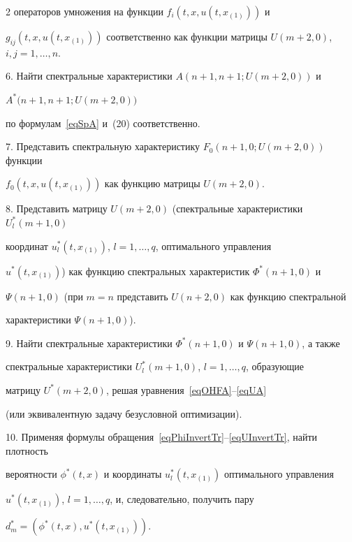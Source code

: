 \begin{multicols}{2}
операторов умножения на функции $f_i(t,x,u(t,x_{(1)}))$ и 


$g_{ij}(t,x,u(t,x_{(1)}))$ соответственно как функции матрицы ${U(m+2,0)}$, ${i,j = 1,\dots,n}$.





6. Найти спектральные характеристики ${A(n+1,n+1; U(m+2,0))}$ и


$A^*(n+1,n+1;$\linebreak $ U(m+2,0))$


по формулам~\eqref{eqSpA} и~(20) соответственно.





7. Представить спектральную характеристику ${F_0(n+1,0; U(m+2,0))}$ функции 


${f_0(t,x,u(t,x_{(1)}))}$ как функцию матрицы ${U(m+2,0)}$.





8.  Представить матрицу ${U(m+2,0)}$ (спект\-раль\-ные характеристики ${U^*_l(m+1,0)}$ 


координат $u^*_l(t,x_{(1)})$, ${l = 1,\dots,q}$, оптимального управления 


$u^*(t,x_{(1)})$) как функцию спектральных ха\-рак\-те\-ристик ${\Phi^*(n+1,0)}$ и 


${\Psi(n+1,0)}$ (при ${m = n}$ представить ${U(n+2,0)}$ как функцию спектральной 


характеристики ${\Psi(n+1,0)}$).





9. Найти спектральные характеристики ${\Phi^*(n+1,0)}$ и ${\Psi(n+1,0)}$, а также 


спектральные характеристики ${U^*_l(m+1,0)}$, ${l = 1,\dots,q}$, обра\-зу\-ющие


матрицу ${U^*(m+2,0)}$, решая уравнения~\eqref{eqOHFA}--\eqref{eqUA} 


(или эквивалентную задачу безусловной оптимизации).





10. Применяя формулы обращения~\eqref{eqPhiInvertTr}--\eqref{eqUInvertTr}, найти плотность 


вероятности $\phi^*(t,x)$ и координаты $u^*_l(t,x_{(1)})$ оптимального управления 


$u^*(t,x_{(1)})$, ${l = 1,\dots,q}$, и, следовательно, получить пару 


${d^*_m = (\phi^*(t,x),u^*(t,x_{(1)}))}$.






\end{multicols}
